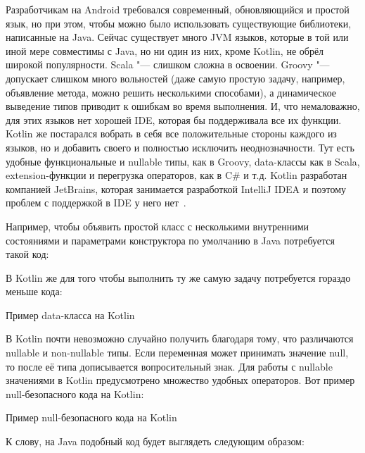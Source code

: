 Разработчикам на Android требовался современный, обновляющийся и простой язык, но при этом, чтобы можно было использовать существующие библиотеки, написанные на Java.
Сейчас существует много JVM языков, которые в той или иной мере совместимы с Java, но ни один из них, кроме Kotlin, не обрёл широкой популярности.
Scala "--- слишком сложна в освоении.
Groovy "--- допускает слишком много вольностей (даже самую простую задачу, например, объявление метода, можно решить несколькими способами), а динамическое выведение типов приводит к ошибкам во время выполнения.
И, что немаловажно, для этих языков нет хорошей IDE, которая бы поддерживала все их функции.
Kotlin же постарался вобрать в себя все положительные стороны каждого из языков, но и добавить своего и полностью исключить неоднозначности.
Тут есть удобные функциональные и nullable типы, как в Groovy, data-классы как в Scala, extension-функции и перегрузка операторов, как в C\# и т.д.
Kotlin разработан компанией JetBrains, которая занимается разработкой IntelliJ IDEA и поэтому проблем с поддержкой в IDE у него нет~\cite{kotlin:features}.

Например, чтобы объявить простой класс с несколькими внутренними состояниями и параметрами конструктора по умолчанию в Java потребуется такой код:\\

\begingroup
\endgroup

В Kotlin же для того чтобы выполнить ту же самую задачу потребуется гораздо меньше кода:

\begin{listing}[H]
  \caption{Пример data-класса на Kotlin}
  \label{lst:studentKt}
\end{listing}

В Kotlin почти невозможно случайно получить  благодаря тому, что различаются nullable и non-nullable типы.
Если переменная может принимать значение null, то после её типа дописывается вопросительный знак.
Для работы с nullable значениями в Kotlin предусмотрено множество удобных операторов.
Вот пример null-безопасного кода на Kotlin:

\begin{listing}[H]
  \caption{Пример null-безопасного кода на Kotlin}
  \label{lst:nullKt}
\end{listing}

К слову, на Java подобный код будет выглядеть следующим образом:


